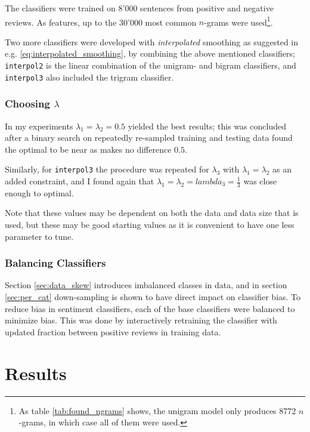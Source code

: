 \documentclass[a4paper,11pt]{kth-mag}
\newcommand{\ngram}{$n$-gram}
\begin{document}
The classifiers were trained on 8'000 sentences from positive and negative reviews.
As features, up to the 30'000 most common \ngram s were used\footnote{As table
\ref{tab:found_ngrams} shows, the unigram model only produces 8772 \ngram s,
in which case all of them were used.}.


Two more classifiers were developed with \emph{interpolated} smoothing as suggested in e.g.
\ref{eq:interpolated_smoothing}, by combining the above mentioned classifiers;
\texttt{interpol2} is the linear combination of the unigram- and bigram classifiers, and \texttt{interpol3}
also included the trigram classifier.

\subsubsection{Choosing $\lambda$}
In my experiments $\lambda_1 = \lambda_2 = 0.5$ yielded the best results; this was concluded after a binary search
on repeatedly re-sampled training and testing data found the optimal to be near as makes no difference $0.5$.

Similarly, for \texttt{interpol3} the procedure was repeated for $\lambda_3$ with $\lambda_1 = \lambda_2$ as an added
constraint, and I found again that $\lambda_1 = \lambda_2 = lambda_3 = \frac{1}{3}$ was close enough to optimal.

Note that these values may be dependent on both the data and data size that is used, but these may be good starting
values as it is convenient to have one less parameter to tune.


\subsubsection{Balancing Classifiers}
\label{subsec:sent_balance}
Section \ref{sec:data_skew} introduces imbalanced classes in data, and in section \ref{sec:per_cat} down-sampling is shown to have direct impact on classifier bias. To reduce bias in sentiment classifiers, each of the base classifiers
were balanced to minimize bias. This was done by interactively retraining the classifier with updated fraction between positive reviews in training data.


\pagebreak
\section{Results}
\end{document}
